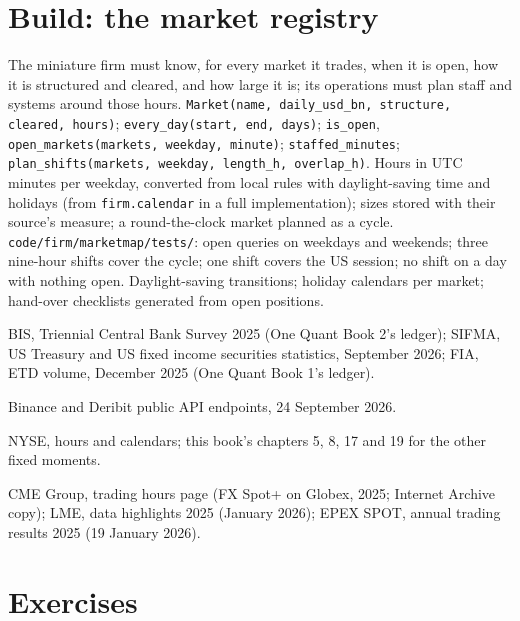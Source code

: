 \section{Build: the market registry}\label{bld:m3:a-map-of-all-markets:marketmap}

\begin{build}
 The miniature firm must know, for every market it trades, when it is open, how it is structured and cleared, and how large it is; its operations
must plan staff and systems around those hours.
 \texttt{Market(name, daily\_usd\_bn, structure, cleared, hours)}; \texttt{every\_day(start, end, days)}; \texttt{is\_open},
\texttt{open\_markets(markets, weekday, minute)}; \texttt{staffed\_minutes}; \texttt{plan\_shifts(markets, weekday, length\_h, overlap\_h)}.
 Hours in UTC minutes per weekday, converted from local rules with daylight-saving time and holidays (from \texttt{firm.calendar} in a full
implementation); sizes stored with their source's measure; a round-the-clock market planned as a cycle.
 \texttt{code/firm/marketmap/tests/}: open queries on weekdays and weekends; three nine-hour shifts cover the cycle; one shift covers the
US session; no shift on a day with nothing open.
 Daylight-saving transitions; holiday calendars per market; hand-over checklists generated from open positions.
\end{build}

\begin{omsources}
\item BIS, Triennial Central Bank Survey 2025 (One Quant Book 2's ledger); SIFMA, US Treasury and US fixed income securities statistics, September 2026;
FIA, ETD volume, December 2025 (One Quant Book 1's ledger).
\item Binance and Deribit public API endpoints, 24 September 2026.
\item NYSE, hours and calendars; this book's chapters 5, 8, 17 and 19 for the other fixed moments.
\item CME Group, trading hours page (FX Spot+ on Globex, 2025; Internet Archive copy); LME, data highlights 2025 (January 2026); EPEX SPOT, annual
trading results 2025 (19 January 2026).
\end{omsources}

\section{Exercises}

